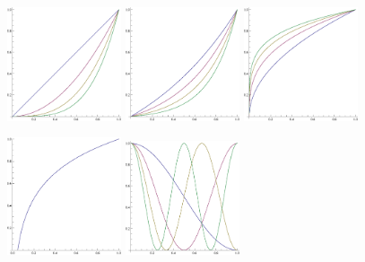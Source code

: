 \documentclass[useAMS,usenatbib]{templates/mn2e}
\begin{document}
\begin{figure}
  \begin{center}
    \includegraphics[width=0.3\textwidth]{fig/Template1n.eps}
    \includegraphics[width=0.3\textwidth]{fig/Template2n.eps}
    \includegraphics[width=0.3\textwidth]{fig/Template3n.eps}
  \end{center}
  \begin{center}
    \includegraphics[width=0.3\textwidth]{fig/Template4n.eps}
    \includegraphics[width=0.3\textwidth]{fig/Template5n.eps}

\end{center}
\end{figure}
\end{document}
